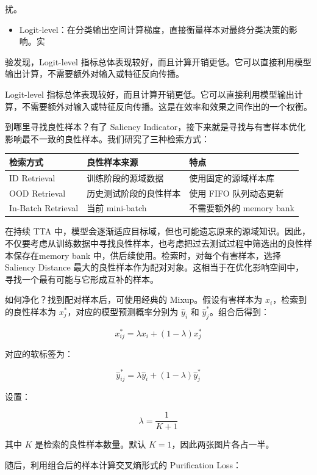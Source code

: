 扰。

\begin{itemize}
  \item Logit-level：在分类输出空间计算梯度，直接衡量样本对最终分类决策的影响。实
\end{itemize}

验发现，Logit-level 指标总体表现较好，而且计算开销更低。它可以直接利用模型输出计算，不需要额外对输入或特征反向传播。

Logit-level 指标总体表现较好，而且计算开销更低。它可以直接利用模型输出计算，不需要额外对输入或特征反向传播。这是在效率和效果之间作出的一个权衡。

到哪里寻找良性样本？有了 Saliency Indicator，接下来就是寻找与有害样本优化影响最不一致的良性样本。我们研究了三种检索方式：

\begin{table}[H]\centering
\begin{tabular}{lll}\toprule
\textbf{检索方式} & \textbf{良性样本来源} & \textbf{特点} \\ \midrule
ID Retrieval & 训练阶段的源域数据 & 使用固定的源域样本库 \\
OOD Retrieval & 历史测试阶段的良性样本 & 使用 FIFO 队列动态更新 \\
In-Batch Retrieval & 当前 mini-batch & 不需要额外的 memory bank \\
\bottomrule\end{tabular}
\end{table}

在持续 TTA 中，模型会逐渐适应目标域，但也可能遗忘原来的源域知识。因此，不仅要考虑从训练数据中寻找良性样本，也考虑把过去测试过程中筛选出的良性样本保存在memory bank 中，供后续使用。检索时，对每个有害样本，选择 Saliency Distance 最大的良性样本作为配对对象。这相当于在优化影响空间中，寻找一个最有可能与它形成互补的样本。

如何净化？找到配对样本后，可使用经典的 Mixup。假设有害样本为 $x_i$，检索到的良性样本为 $x_j^{*}$，对应的模型预测概率分别为 $\hat{y}_i$ 和 $\hat{y}_j^{*}$。组合后得到：

\[
x^{*}_{ij}=\lambda x_i+(1-\lambda)x_j^{*}
\]

对应的软标签为：

\[
\hat{y}^{*}_{ij}=\lambda\hat{y}_i+(1-\lambda)\hat{y}_j^{*}
\]

设置：

\[
\lambda=\frac{1}{K+1}
\]

其中 $K$ 是检索的良性样本数量。默认 $K=1$，因此两张图片各占一半。

随后，利用组合后的样本计算交叉熵形式的 Purification Loss：

